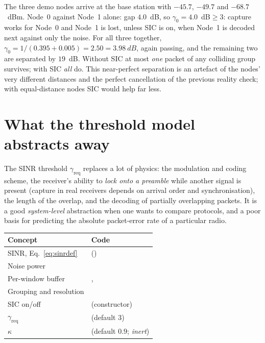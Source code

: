 \begin{example}
The three demo nodes arrive at the base station with $-45.7$, $-49.7$ and $-68.7$~dBm. Node~0 against Node~1 alone: gap $4.0$~dB, so $\gamma_0=4.0$~dB$\ge3$: capture works for Node~0 and Node~1 is lost, unless SIC is on, when Node~1 is decoded next against only the noise. For all three together,
$\gamma_0=1/(0.395+0.005)=2.50=\SI{3.98}{dB}$, again passing, and the remaining two are separated by $19$~dB. Without SIC at most \emph{one} packet of any colliding group survives; with SIC \emph{all} do.
This near-perfect separation is an artefact of the nodes' very different distances and the perfect cancellation of the previous reality check; with equal-distance nodes SIC would help far less.
\end{example}

\section{What the threshold model abstracts away}

The SINR threshold $\gamma_{\mathrm{req}}$ replaces a lot of physics: the modulation and coding scheme, the receiver's ability to
\emph{lock onto a preamble} while another signal is present (capture in real receivers depends on arrival order and synchronisation),
the length of the overlap, and the decoding of partially overlapping packets. It is a good \emph{system-level} abstraction when one wants to compare
protocols, and a poor basis for predicting the absolute packet-error rate of a particular radio.

\begin{codemap}
\small
\begin{tabularx}{\linewidth}{@{}>{\ttfamily}p{5.0cm}X@{}}
\toprule
\normalfont\bfseries Concept & \normalfont\bfseries Code\\
\midrule
SINR, Eq.~\eqref{eq:sinrdef} & \code{apply_sic} (\file{packet_analysis.py})\\
Noise power & \codew{thermal_noise_watts}\\
Per-window buffer & \codew{BSBehavior._rx_buffer}, \code{_buffer_rx}\\
Grouping and resolution & \codew{BSBehavior._process_rx_buffer}\\
SIC on/off & \code{enable_sic} (constructor)\\
$\gamma_{\mathrm{req}}$ & \codew{required_sinr_db} (default $3$)\\
$\kappa$ & \codew{cancellation_factor} (default $0.9$; \emph{inert})\\
\bottomrule
\end{tabularx}
\end{codemap}

